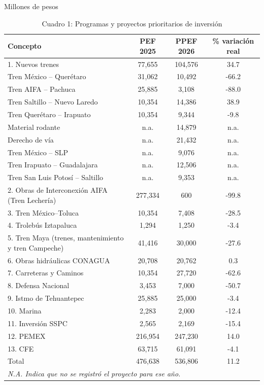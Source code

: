 \begin{table}[htbp]
\centering
\caption{Cuadro 1: Programas y proyectos prioritarios de inversión}
\small Millones de pesos
\begin{tabular}{lccc}
\toprule
Concepto & PEF 2025 & PPEF 2026 & \% variación real \\
\midrule
1. Nuevos trenes & 77,655 & 104,576 & 34.7 \\
   Tren México – Querétaro & 31,062 & 10,492 & -66.2 \\
   Tren AIFA – Pachuca & 25,885 & 3,108 & -88.0 \\
   Tren Saltillo – Nuevo Laredo & 10,354 & 14,386 & 38.9 \\
   Tren Querétaro – Irapuato & 10,354 & 9,344 & -9.8 \\
   Material rodante & n.a. & 14,879 & n.a. \\
   Derecho de vía & n.a. & 21,432 & n.a. \\
   Tren México – SLP & n.a. & 9,076 & n.a. \\
   Tren Irapuato – Guadalajara & n.a. & 12,506 & n.a. \\
   Tren San Luis Potosí – Saltillo & n.a. & 9,353 & n.a. \\
2. Obras de Interconexión AIFA (Tren Lechería) & 277,334 & 600 & -99.8 \\
3. Tren México–Toluca & 10,354 & 7,408 & -28.5 \\
4. Trolebús Iztapaluca & 1,294 & 1,250 & -3.4 \\
5. Tren Maya (trenes, mantenimiento y tren Campeche) & 41,416 & 30,000 & -27.6 \\
6. Obras hidráulicas CONAGUA & 20,708 & 20,762 & 0.3 \\
7. Carreteras y Caminos & 10,354 & 27,720 & -62.6 \\
8. Defensa Nacional & 3,453 & 7,000 & -50.7 \\
9. Istmo de Tehuantepec & 25,885 & 25,000 & -3.4 \\
10. Marina & 2,283 & 2,000 & -12.4 \\
11. Inversión SSPC & 2,565 & 2,169 & -15.4 \\
12. PEMEX & 216,954 & 247,230 & 14.0 \\
13. CFE & 63,715 & 61,091 & -4.1 \\
Total & 476,638 & 536,806 & 11.2 \\
\midrule
\multicolumn{4}{l}{\footnotesize \textit{N.A. Indica que no se registró el proyecto para ese año.}}
\multicolumn{4}{l}{\footnotesize Fuente: Elaborado por el CIEP, con información de SHCP (2025a).}
\bottomrule
\end{tabular}
\end{table}
